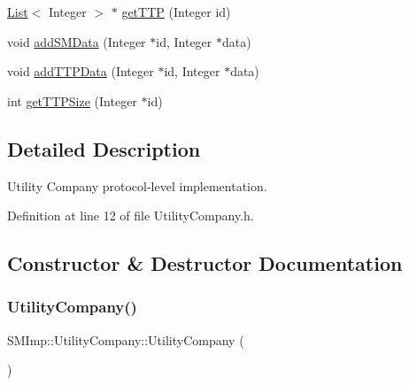 \begin{DoxyCompactItemize}
\item 
\hyperlink{classList}{List}$<$ Integer $>$ $\ast$ \hyperlink{classSMImp_1_1UtilityCompany_a3e0d30043e9d880b8f8447232af914c2}{get\+T\+TP} (Integer id)
\item 
void \hyperlink{classSMImp_1_1UtilityCompany_a9e6da1e8015a803748b644d186619a8f}{add\+S\+M\+Data} (Integer $\ast$id, Integer $\ast$data)
\item 
void \hyperlink{classSMImp_1_1UtilityCompany_a03e5d17d5403d9f7527b81d82156650c}{add\+T\+T\+P\+Data} (Integer $\ast$id, Integer $\ast$data)
\item 
int \hyperlink{classSMImp_1_1UtilityCompany_a62d792edc023bd9b8bad3cfdc76f985b}{get\+T\+T\+P\+Size} (Integer $\ast$id)
\end{DoxyCompactItemize}


\subsection{Detailed Description}
Utility Company protocol-\/level implementation. 

Definition at line 12 of file Utility\+Company.\+h.



\subsection{Constructor \& Destructor Documentation}
\mbox{\label{classSMImp_1_1UtilityCompany_a39c0aca6d615398d97d475b52ee22e89}} 
\subsubsection{\texorpdfstring{Utility\+Company()}{UtilityCompany()}\hspace{0.1cm}{\footnotesize\ttfamily [1/2]}}
{\footnotesize\ttfamily S\+M\+Imp\+::\+Utility\+Company\+::\+Utility\+Company (\begin{DoxyParamCaption}\item[{S\+H\+A1 $\ast$}]{ }\end{DoxyParamCaption})}

\mbox{\label{classSMImp_1_1UtilityCompany_ab0f04eabfbaf56660c1d199da8170fe0}} 
